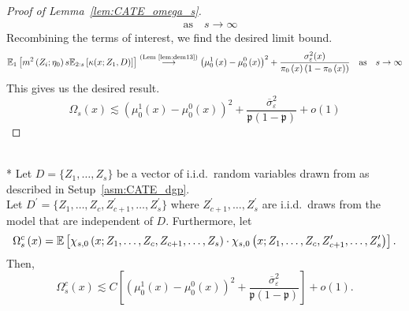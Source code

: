 \begin{proof}[Proof of Lemma~\ref{lem:CATE_omega_s}]
\begin{equation}
\begin{aligned}
			\quad \text{as} \quad s \rightarrow \infty
		\end{aligned}
	\end{equation}
	Recombining the terms of interest, we find the desired limit bound.
	\begin{equation}
		\begin{aligned}
			\mathbb{E}_{1}\left[m^2\left(Z_{i}; \eta_{0}\right) s \mathbb{E}_{2:s}\left[\kappa(x; Z_1, D)\right]\right]
			\overset{\text{(Lem~\ref{lem:dem13})}}{\longrightarrow} \left(\mu_{0}^{1}\left(x\right) - \mu_{0}^{0}\left(x\right)\right)^2 + \frac{\sigma_{\varepsilon}^2(x)}{\pi_{0}\left(x\right)\left(1 - \pi_{0}\left(x\right)\right)}
			\quad \text{as} \quad s \rightarrow \infty
		\end{aligned}
	\end{equation}
    This gives us the desired result.
    \begin{equation}
        \Omega_{s}\left(x\right)
        \lesssim \left(\mu_{0}^{1}\left(x\right) - \mu_{0}^{0}\left(x\right)\right)^2 + \frac{\overline{\sigma}^2_{\varepsilon}}{\mathfrak{p}\left(1 - \mathfrak{p}\right)} + o(1)
    \end{equation}
\end{proof}

\begin{boxD}
    \begin{lem}\label{lem:CATE_omega_sc}\mbox{}\\*
	Let $D = \{Z_1, \dotsc, Z_{s}\}$ be a vector of i.i.d.\ random variables drawn from as described in Setup~\ref{asm:CATE_dgp}.\\
	Let $D^{\prime} = \{Z_1, \dotsc, Z_{c}, Z_{c+1}^{\prime}, \dotsc,  Z_{s}^{\prime}\}$ where $Z_{c+1}^{\prime}, \dotsc,  Z_{s}^{\prime}$ are i.i.d.\ draws from the model that are independent of $D$.
	Furthermore, let
	\begin{equation}
		\Omega_{s}^{c}\left(x\right)
		= \mathbb{E}\left[\chi_{s,0}\left(x; Z_1, \ldots, Z_{c}, Z_{c+1}, \ldots, Z_{s}\right) \cdot
			\chi_{s,0}\left(x; Z_1, \ldots,Z_{c}, Z_{c+1}^{\prime}, \ldots, Z_{s}^{\prime}\right)\right].
	\end{equation}
	Then,
	\begin{equation}
		\Omega_{s}^{c}\left(x\right)
		\lesssim C \left[\left(\mu_{0}^{1}\left(x\right) - \mu_{0}^{0}\left(x\right)\right)^2
		+ \frac{\overline{\sigma}^2_{\varepsilon}}{\mathfrak{p}\left(1 - \mathfrak{p}\right)}\right] + o(1).
	\end{equation}
\end{lem}
\end{boxD}


